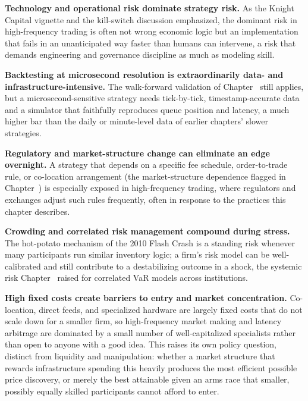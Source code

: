 \documentclass[../ai_in_finance]{subfiles}
\begin{document}
\textbf{Technology and operational risk dominate strategy risk.} As the Knight Capital vignette and the kill-switch discussion emphasized, the dominant risk in high-frequency trading is often not wrong economic logic but an implementation that fails in an unanticipated way faster than humans can intervene, a risk that demands engineering and governance discipline as much as modeling skill.

\textbf{Backtesting at microsecond resolution is extraordinarily data- and infrastructure-intensive.} The walk-forward validation of Chapter~ still applies, but a microsecond-sensitive strategy needs tick-by-tick, timestamp-accurate data and a simulator that faithfully reproduces queue position and latency, a much higher bar than the daily or minute-level data of earlier chapters' slower strategies.

\textbf{Regulatory and market-structure change can eliminate an edge overnight.} A strategy that depends on a specific fee schedule, order-to-trade rule, or co-location arrangement (the market-structure dependence flagged in Chapter~) is especially exposed in high-frequency trading, where regulators and exchanges adjust such rules frequently, often in response to the practices this chapter describes.

\textbf{Crowding and correlated risk management compound during stress.} The hot-potato mechanism of the 2010 Flash Crash is a standing risk whenever many participants run similar inventory logic; a firm's risk model can be well-calibrated and still contribute to a destabilizing outcome in a shock, the systemic risk Chapter~ raised for correlated VaR models across institutions.

\textbf{High fixed costs create barriers to entry and market concentration.} Co-location, direct feeds, and specialized hardware are largely fixed costs that do not scale down for a smaller firm, so high-frequency market making and latency arbitrage are dominated by a small number of well-capitalized specialists rather than open to anyone with a good idea. This raises its own policy question, distinct from liquidity and manipulation: whether a market structure that rewards infrastructure spending this heavily produces the most efficient possible price discovery, or merely the best attainable given an arms race that smaller, possibly equally skilled participants cannot afford to enter.
\end{document}
